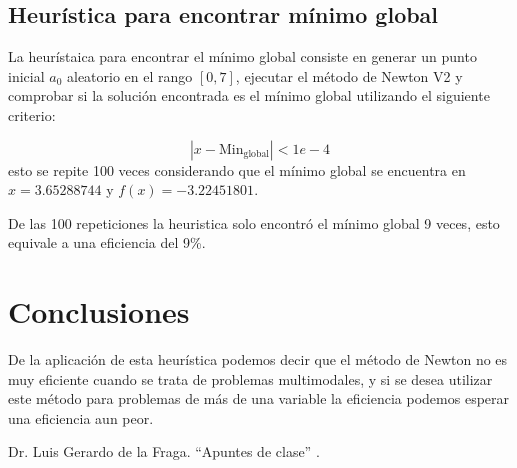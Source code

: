 \documentclass[conference]{IEEEtran}
\begin{document}
\subsection{Heurística para encontrar mínimo global}
La heurístaica para encontrar el mínimo global consiste en generar un punto inicial $a_{0}$ aleatorio en el rango $[0,7]$, ejecutar el método de Newton V2 y comprobar si la solución encontrada es el mínimo global utilizando el siguiente criterio:

\begin{equation}
	|x - \text{Min}_{\text{global}}| < 1e-4
\end{equation}
esto se repite 100 veces considerando que el mínimo global se encuentra en $x = 3.65288744$ y $f(x) = -3.22451801$.

De las 100 repeticiones la heuristica solo encontró el mínimo global 9 veces, esto equivale a una eficiencia del 9\%.

\section{Conclusiones}

De la aplicación de esta heurística podemos decir que el método de Newton no es muy eficiente cuando se trata de problemas multimodales, y si se desea utilizar este método para problemas de más de una variable la eficiencia podemos esperar una eficiencia aun peor.



\begin{thebibliography}{00}
  Dr. Luis Gerardo de la Fraga. ``Apuntes de clase'' .
\end{thebibliography}
\end{document}
